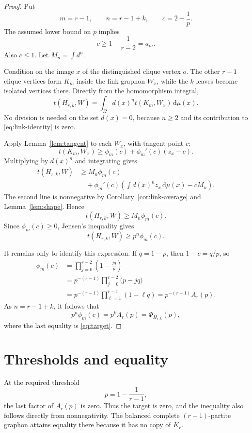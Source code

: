 \documentclass[11pt]{article}
\newcommand{\dd}{\,\mathrm{d}}
\begin{document}
\begin{proof}
Put
\[
m=r-1,
\qquad
n=r-1+k,
\qquad
c=2-\frac1p.
\]
The assumed lower bound on $p$ implies
\[
c\geq1-\frac1{r-2}=a_m.
\]
Also $c\leq1$.  Let $M_n=\int d^n$.

Condition on the image $x$ of the distinguished clique vertex $o$.
The other $r-1$ clique vertices form $K_m$ inside the link graphon
$W_x$, while the $k$ leaves become isolated vertices there.  Directly
from the homomorphism integral,
\begin{equation}
t(H_{r,k},W)
=
\int_\Omega d(x)^n t(K_m,W_x)\dd\mu(x).
\label{eq:link-identity}
\end{equation}
No division is needed on the set $d(x)=0$, because $n\geq2$ and its
contribution to \eqref{eq:link-identity} is zero.

Apply Lemma~\ref{lem:tangent} to each $W_x$, with tangent point $c$:
\[
t(K_m,W_x)
\geq
\phi_m(c)+\phi_m'(c)(z_x-c).
\]
Multiplying by $d(x)^n$ and integrating gives
\begin{align*}
t(H_{r,k},W)
&\geq
M_n\phi_m(c)
\\
&\quad+
\phi_m'(c)
\left(\int d(x)^nz_x\dd\mu(x)-cM_n\right).
\end{align*}
The second line is nonnegative by
Corollary~\ref{cor:link-average} and Lemma~\ref{lem:shape}.  Hence
\[
t(H_{r,k},W)\geq M_n\phi_m(c).
\]
Since $\phi_m(c)\geq0$, Jensen's inequality gives
\[
t(H_{r,k},W)
\geq p^n\phi_m(c).
\]

It remains only to identify this expression.  If $q=1-p$, then
$1-c=q/p$, so
\begin{align*}
\phi_m(c)
&=
\prod_{j=0}^{r-2}\left(1-\frac{jq}{p}\right)
\\
&=
p^{-(r-1)}
\prod_{j=0}^{r-2}\bigl(p-jq\bigr)
\\
&=
p^{-(r-1)}
\prod_{\ell=1}^{r-1}(1-\ell q)
=p^{-(r-1)}A_r(p).
\end{align*}
As $n=r-1+k$, it follows that
\[
p^n\phi_m(c)=p^kA_r(p)=\Phi_{H_{r,k}}(p),
\]
where the last equality is \eqref{eq:target}.
\end{proof}


\section{Thresholds and equality}

At the required threshold
\[
p=1-\frac1{r-1},
\]
the last factor of $A_r(p)$ is zero.  Thus the target is zero, and the
inequality also follows directly from nonnegativity.  The balanced
complete $(r-1)$-partite graphon attains equality there because it has
no copy of $K_r$.
\end{document}
